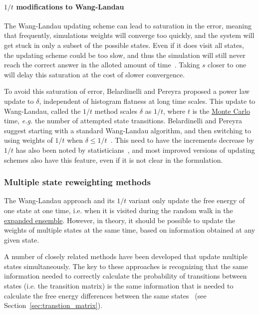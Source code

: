 \documentclass[9pt,review]{livecoms}
\begin{document}
\paragraph{$1/t$ modifications to Wang-Landau}
The Wang-Landau updating scheme can lead to saturation in the error,
meaning that frequently, simulations weights will converge too quickly, and the system will get stuck in only a subset of the possible states.  Even if it does visit all states, the updating scheme could be too slow, and thus the simulation will still  never reach the correct answer in the alloted amount of time~\cite{Belardinelli2007, Belardinelli2008}.  Taking $s$ closer to one will delay this saturation at the cost of slower convergence.

To avoid this saturation of error, Belardinelli and Pereyra proposed a
power law update to $\delta$, independent of histogram flatness at
long time scales. This update to Wang-Landau, called the $1/t$ method
scales $\delta$ as $1/t$, where $t$ is the \hyperlink{ref:MetropolisMonteCarlo} {Monte Carlo} time, \textit{e.g.} the
number of attempted state transitions.  Belardinelli and Pereyra
suggest starting with a standard Wang-Landau algorithm, and then
switching to using weights of $1/t$ when $\delta \leq 1/t$~\cite{Belardinelli2008, Belardinelli2007}. This need to have the increments decrease by $1/t$ has also been noted by statisticians~\cite{wl_convergence}, and most improved versions of updating schemes also have this feature, even if it is not clear in the formulation.

\subsubsection{\label{sec:multiplestatemethods}Multiple state reweighting methods}

The Wang-Landau approach and its $1/t$ variant only update the free energy of one state at one time, i.e. when it is visited during the random walk in the \hyperlink{ref:ExpEns} {expanded ensemble}.  However, in theory, it should be possible to update the weights of multiple states at the same time, based on information obtained at any given state.

A number of closely related methods have been developed that update multiple states simultaneously. The key to these approaches is recognizing that the same information needed to correctly calculate the probability of  transitions between states (i.e. the transition matrix) is the same information that is needed to calculate the free energy differences between the same states~\cite{escobedo_transition_2006,Wang:JoSP:2002} (see Section~\ref{sec:transtion_matrix}).
\end{document}
